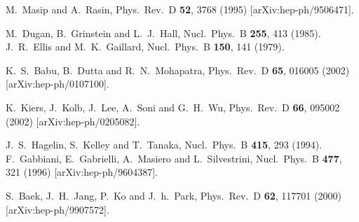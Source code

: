 \documentclass[prd,aps,preprint,tightenlines,superscriptaddress]{revtex4}
\begin{document}
\begin{thebibliography}
  
  M.~Masip and A.~Rasin,
  Phys.\ Rev.\  D {\bf 52}, 3768 (1995)
  [arXiv:hep-ph/9506471].



M.~Dugan, B.~Grinstein and L.~J.~Hall,
  Nucl.\ Phys.\  B {\bf 255}, 413 (1985).
J.~R.~Ellis and M.~K.~Gaillard,
  Nucl.\ Phys.\  B {\bf 150}, 141 (1979).



  K.~S.~Babu, B.~Dutta and R.~N.~Mohapatra,
  Phys.\ Rev.\  D {\bf 65}, 016005 (2002)
  [arXiv:hep-ph/0107100].

  K.~Kiers, J.~Kolb, J.~Lee, A.~Soni and G.~H.~Wu,
  Phys.\ Rev.\  D {\bf 66}, 095002 (2002)
  [arXiv:hep-ph/0205082].






J.~S.~Hagelin, S.~Kelley and T.~Tanaka,
  Nucl.\ Phys.\  B {\bf 415}, 293 (1994).
F.~Gabbiani, E.~Gabrielli, A.~Masiero and L.~Silvestrini,
  Nucl.\ Phys.\  B {\bf 477}, 321 (1996)
  [arXiv:hep-ph/9604387].


S.~Baek, J.~H.~Jang, P.~Ko and J.~h.~Park,
  Phys.\ Rev.\  D {\bf 62}, 117701 (2000)
  [arXiv:hep-ph/9907572].
  


\end{thebibliography}
\end{document}
